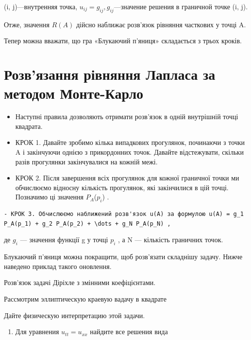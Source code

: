 \documentclass[
  ukrainian,
]{article}
\providecommand{\tightlist}{%
  \setlength{\itemsep}{0pt}\setlength{\parskip}{0pt}}
\begin{document}
(i, j)---внутренняя точка, \(u_{ij} = g_{ij}, g_{ij}\)---значение
решения в граничной точке (i, j).

Отже, значення \(R(A)\) дійсно наближає розв'язок рівняння часткових у
точці A.

Тепер можна вважати, що гра «Блукаючий п'яниця» складається з трьох
кроків.

\section{Розв'язання рівняння Лапласа за методом
Монте-Карло}\label{ux440ux43eux437ux432ux44fux437ux430ux43dux43dux44f-ux440ux456ux432ux43dux44fux43dux43dux44f-ux43bux430ux43fux43bux430ux441ux430-ux437ux430-ux43cux435ux442ux43eux434ux43eux43c-ux43cux43eux43dux442ux435-ux43aux430ux440ux43bux43e}

\begin{itemize}
\item
  Наступні правила дозволяють отримати розв'язок в одній внутрішній
  точці квадрата.
\item
  КРОК 1. Давайте зробимо кілька випадкових прогулянок, починаючи з
  точки A і закінчуючи однією з прикордонних точок. Давайте
  відстежувати, скільки разів прогулянки закінчувалися на кожній межі.
\item
  КРОК 2. Після завершення всіх прогулянок для кожної граничної точки ми
  обчислюємо відносну кількість прогулянок, які закінчилися в цій точці.
  Позначимо ці значення \(P_A\)(\(p_i\)) .
\end{itemize}

\begin{verbatim}
- КРОК 3. Обчислюємо наближений розв'язок u(A) за формулою u(A) = g_1 P_A(p_1) + g_2 P_A(p_2) + \dots + g_N P_A(p_N) ,
\end{verbatim}

де \(g_i\) --- значення функції g у точці \(p_i\) , а N --- кількість
граничних точок.

Блукаючий п'яниця можна покращити, щоб розв'язати складнішу задачу.
Нижче наведено приклад такого оновлення.

Розв'язок задачі Діріхле з змінними коефіцієнтами.

Рассмотрим эллиптическую краевую вадачу в квадрате

Дайте физическую интерпретацию этой задачи.

\begin{enumerate}
\def\labelenumi{\arabic{enumi}.}
\setcounter{enumi}{3}
\tightlist
\item
  Для уравнения \(u_{tt} = u_{xx}\) найдите все решения вида
\end{enumerate}
\end{document}

